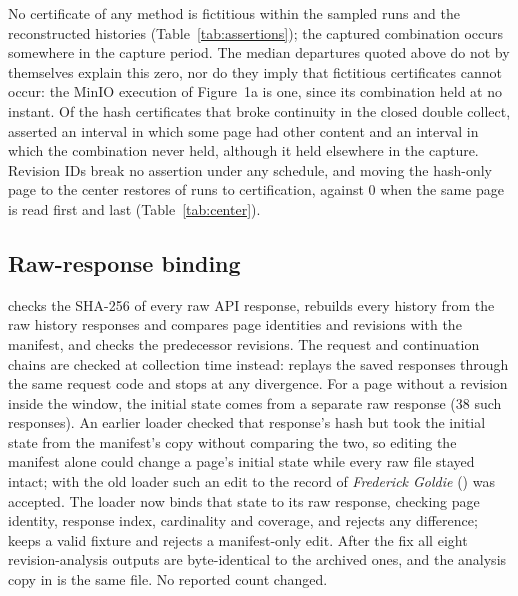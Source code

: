 \begin{table}[t]
\caption{The hash-only page read once at the center, against the all-revision-ID revisit order on the same bundles and start times (certified of 4{,}000; the first method breaks no assertion anywhere).}
\label{tab:center}
\small

\end{table}

No certificate of any method is fictitious within the sampled runs and the
reconstructed histories (Table~\ref{tab:assertions}); the captured combination
occurs somewhere in the capture period. The median departures quoted above do
not by themselves explain this zero, nor do they imply that fictitious
certificates cannot occur: the MinIO execution of Figure~1a is one, since its
combination held at no instant. Of the \closedHashFalseGTwo{} hash
certificates that broke continuity in the closed double collect,
\closedHashClaim{} asserted an interval in which some page had other content
and \closedHashFalseGOne{} an interval in which the combination never held,
although it held elsewhere in the capture. Revision IDs break no assertion
under any schedule, and moving the hash-only page to the center restores
\mixedCenterCertificates{} of \nBundleRuns{} runs to certification, against 0
when the same page is read first and last (Table~\ref{tab:center}).

\subsection{Raw-response binding}
 checks the SHA-256 of every raw API response, rebuilds every
history from the raw history responses and compares page identities and
revisions with the manifest, and checks the predecessor revisions. The request
and continuation chains are checked at collection time instead:
 replays the saved responses through the same request
code and stops at any divergence. For a page without a revision inside
the window, the initial state comes from a separate raw response (38 such
responses). An earlier loader checked that response's hash but took the
initial state from the manifest's copy without comparing the two, so editing
the manifest alone could change a page's initial state while every raw file
stayed intact; with the old loader such an edit to the record of
\emph{Frederick Goldie} () was accepted. The
loader now binds that state to its raw response, checking page identity,
response index, cardinality and coverage, and rejects any difference;
 keeps a valid fixture and
rejects a manifest-only edit. After the fix all eight revision-analysis outputs
are byte-identical to the archived ones, and the analysis copy in
 is the same file. No reported
count changed.

